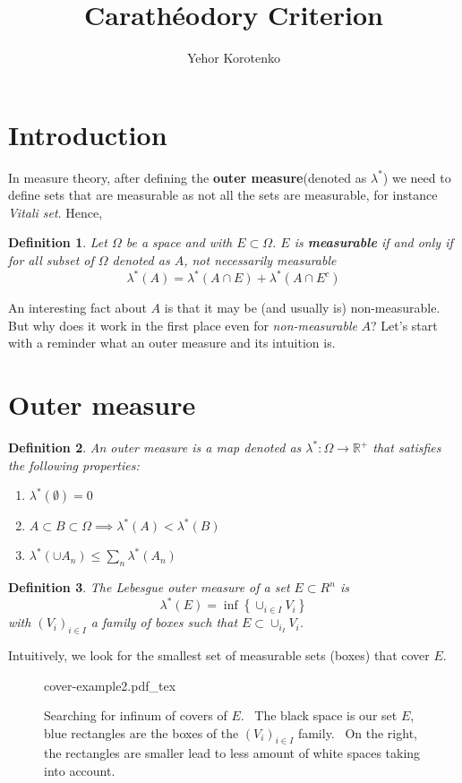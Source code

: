 \documentclass[a4paper]{article}
\author{Yehor Korotenko}
\title{Carathéodory Criterion}
\newcommand{\incfig}[1]{%
    \def\svgwidth{\columnwidth}
    {#1.pdf_tex}
}
\newcommand{\R}{\mathbb{R}}
\newtheorem{definition}{Definition}[section]
\begin{document}
\section{Introduction}
   In measure theory, after defining the \textbf{outer measure}(denoted as $\lambda^*$) we need to
   define sets that are measurable as not all the sets are measurable, for
   instance \textit{Vitali set}. Hence,
\begin{definition}
Let $\Omega$ be a space and with $E \subset \Omega$. $E$ is  \textbf{measurable} if and only if for all subset of $\Omega$ denoted as $A$, not necessarily measurable
\[
\lambda^*(A) = \lambda^*(A \cap E) + \lambda^*(A \cap E^c)
\] 
\end{definition}
An interesting fact about $A$ is that it may be (and usually is)
non-measurable. But why does it work in the first place even for
\textit{non-measurable} $A$? Let's start with a reminder what an outer measure and its intuition is.

\section{Outer measure}%
\label{sec:Outer measure}
\begin{definition}
    An outer measure is a map denoted as $\lambda^*: \Omega \to \R^+$ that satisfies the following properties:
    \begin{enumerate}
        \item $\lambda^*(\emptyset) = 0$
        \item $A \subset B \subset \Omega \implies \lambda^*(A) < \lambda^*(B)$ 
        \item $\lambda^*(\cup A_n) \le \sum_n \lambda^*(A_n)$
    \end{enumerate}
\end{definition}
\begin{definition}\label{defn:lebesgue-outer-measure}
    The Lebesgue outer measure of a set $E \subset R^n$ is 
    \[
        \lambda^*(E) = \inf \left\{ \cup_{i \in I} V_i \right\}
    \] 
    with $(V_i)_{i \in I}$ a family of boxes such that $E \subset \cup_{i_I} V_i$.
\end{definition}

Intuitively, we look for the smallest set of measurable sets (boxes) that cover
$E$.  

\begin{figure}[H]
    \centering
    \incfig{cover-example2}
    \caption{Searching for infinum of covers of $E$. \
        The black space is our
        set $E$, blue rectangles are the boxes of the  $(V_i)_{i \in I}$
        family. \
        On the right, the rectangles are smaller lead to less amount of white spaces taking into account.}
    \label{fig:cover-example2}
\end{figure}
\end{document}
